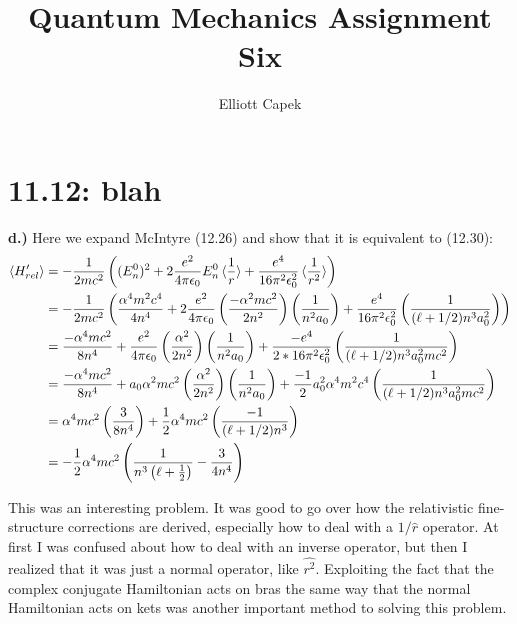 \documentclass[10pt]{article} %
\title{Quantum Mechanics Assignment Six}
\author{Elliott Capek}
\begin{document}
\maketitle{}

\section{11.12: blah}

\textbf{d.)}
Here we expand McIntyre (12.26) and show that it is equivalent to (12.30):\\

\begin{align*}
  \braket{H'_{rel}} &=
  -\frac{1}{2mc^2}\left((E_n^0)^2 +
  2\frac{e^2}{4\pi\epsilon_0}E_n^0\braket{\frac{1}{r}} +
  \frac{e^4}{16\pi^2\epsilon_0^2}\braket{\frac{1}{r^2}}\right)\\
  &= -\frac{1}{2mc^2}\left(\frac{\alpha^4m^2c^4}{4n^4}
  + 2\frac{e^2}{4\pi\epsilon_0}\left(\frac{-\alpha^2mc^2}{2n^2}\right)
  \left(\frac{1}{n^2a_0}\right) +
  \frac{e^4}{16\pi^2\epsilon_0^2}\left(\frac{1}{(\ell+1/2)n^3a_0^2}\right)\right)\\
  &= \frac{-\alpha^4mc^2}{8n^4}
  + \frac{e^2}{4\pi\epsilon_0}\left(\frac{\alpha^2}{2n^2}\right)
  \left(\frac{1}{n^2a_0}\right) +
  \frac{-e^4}{2*16\pi^2\epsilon_0^2}\left(\frac{1}{(\ell+1/2)n^3a_0^2mc^2}\right)\\
  &= \frac{-\alpha^4mc^2}{8n^4}
  + a_0\alpha^2mc^2\left(\frac{\alpha^2}{2n^2}\right)
  \left(\frac{1}{n^2a_0}\right) +
  \frac{-1}{2}a_0^2\alpha^4m^2c^4\left(\frac{1}{(\ell+1/2)n^3a_0^2mc^2}\right)\\
  &= \alpha^4mc^2\left(\frac{3}{8n^4}\right) +
  \frac{1}{2}\alpha^4mc^2\left(\frac{-1}{(\ell+1/2)n^3}\right)\\
  &= -\frac{1}{2}\alpha^4mc^2\left(\frac{1}{n^3\left(\ell+\frac{1}{2}\right)} -
    \frac{3}{4n^4}\right)\\
\end{align*}

This was an interesting problem. It was good to go over how the relativistic fine-
structure corrections are derived, especially how to deal with a $1/\hat{r}$
operator. At first I was confused about how to deal with an inverse operator, but
then I realized that it was just a normal operator, like $\hat{r^2}$. Exploiting
the fact that the complex conjugate Hamiltonian acts on bras the same way that the
normal Hamiltonian acts on kets was another important method to solving this problem.\\
\end{document}
